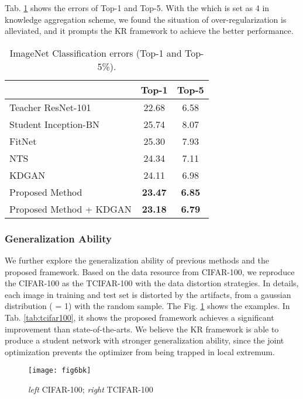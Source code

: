 \documentclass[10pt,twocolumn,letterpaper]{article}
\begin{document}
Tab. \ref{tab:imagenet1} shows the errors of Top-1 and Top-5.
With the  which is set as 4 in knowledge aggregation scheme,
we found the situation of over-regularization is alleviated,
and it prompts the KR framework to achieve the better performance.

\begin{table}[h]
\begin{center}
\begin{tabular}{l|c|c}
\hline
 & Top-1 & Top-5 \\
\hline
Teacher ResNet-101 & 22.68 & 6.58 \\
Student Inception-BN \cite{Bn2015} & 25.74 & 8.07 \\
FitNet \cite{Romero2014FitNets} & 25.30 & 7.93 \\
NTS \cite{huang2017like} & 24.34 & 7.11 \\
KDGAN \cite{wang2018kdgan} & 24.11 & 6.98 \\
Proposed Method & \textbf{23.47} & \textbf{6.85} \\
Proposed Method + KDGAN \cite{wang2018kdgan} & \textbf{23.18} & \textbf{6.79} \\
\hline
\end{tabular}
\end{center}
\caption{ImageNet Classification errors (Top-1 and Top-5\%). }
\label{tab:imagenet1}
\end{table}

\subsubsection{Generalization Ability}
We further explore the generalization ability of
previous methods and the proposed framework.
Based on the data resource from CIFAR-100,
we reproduce the CIFAR-100 as the TCIFAR-100
with the data distortion strategies.
In details,
each image in training and test set is distorted by the artifacts,
from a gaussian distribution ( = 1) with the random sample.
The Fig. \ref{fig:tcifar-100ep} shows the examples.
In Tab. \ref{tab:tcifar100},
it shows the proposed framework
achieves a significant improvement than state-of-the-arts.
We believe the KR framework is able to produce
a student network with stronger generalization ability,
since the joint optimization prevents the optimizer
from being trapped in local extremum.

\begin{figure}[ht]
  \centering
  \texttt{[image: fig6bk]}
  \caption{\emph{left} CIFAR-100; \emph{right} TCIFAR-100}
  \label{fig:tcifar-100ep}
\end{figure}
\end{document}
